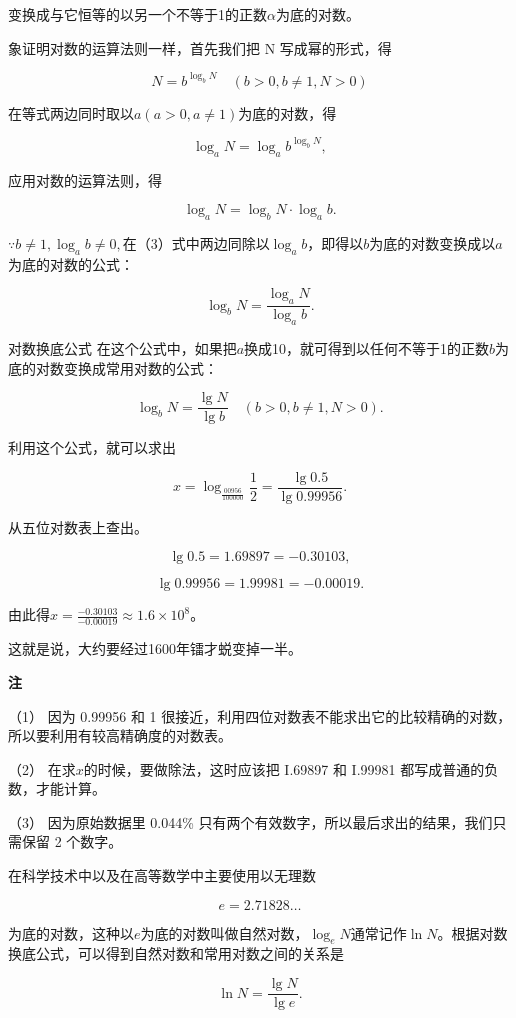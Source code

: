 变换成与它恒等的以另一个不等于1的正数\(\alpha\)为底的对数。

象证明对数的运算法则一样，首先我们把 N 写成幂的形式，得

\[
N = b^{\log_{b} N} \quad (b > 0, b \neq 1, N > 0) \tag {2}
\]

在等式两边同时取以\(a(a > 0, a \neq 1)\)为底的对数，得

\[
\log_{a} N = \log_{a} b^{\log_{b} N},
\]

应用对数的运算法则，得

\[
\log_{a} N = \log_{b} N \cdot \log_{a} b. \tag {3}
\]

\(\because b \neq 1, \log_{a} b \neq 0,\)在（3）式中两边同除以\(\log_{a} b\)，即得以\(b\)为底的对数变换成以\(a\)为底的对数的公式：

\[
\log_{b} N = \frac{\log_{a} N}{\log_{a} b}.
\]

对数换底公式
在这个公式中，如果把\(a\)换成10，就可得到以任何不等于1的正数\(b\)为底的对数变换成常用对数的公式：

\[
\log_{b} N = \frac{\lg N}{\lg b} \quad (b > 0, b \neq 1, N > 0).
\]

利用这个公式，就可以求出

\[
x = \log_{\frac{00956}{100000}} \frac{1}{2} = \frac{\lg 0.5}{\lg 0.99956}.
\]

从五位对数表上查出。

\[
\lg 0.5 = 1.69897 = - 0.30103,
\]

\[
\lg 0.99956 = 1.99981 = - 0.00019.
\]

由此得\(x = \frac{-0.30103}{-0.00019} \approx 1.6 \times 10^{8}\)。

这就是说，大约要经过1600年镭才蜕变掉一半。

\textbf{注}

（1） 因为 0.99956 和 1
很接近，利用四位对数表不能求出它的比较精确的对数，所以要利用有较高精确度的对数表。

（2） 在求\(x\)的时候，要做除法，这时应该把 I.69897 和 I.99981
都写成普通的负数，才能计算。

（3） 因为原始数据里 0.044\%
只有两个有效数字，所以最后求出的结果，我们只需保留 2 个数字。

在科学技术中以及在高等数学中主要使用以无理数

\[
e = 2.71828 \dots
\]

为底的对数，这种以\(e\)为底的对数叫做自然对数，\(\log_e N\)通常记作\(\ln N\)。根据对数换底公式，可以得到自然对数和常用对数之间的关系是

\[
\ln N = \frac{\lg N}{\lg e}.
\]

